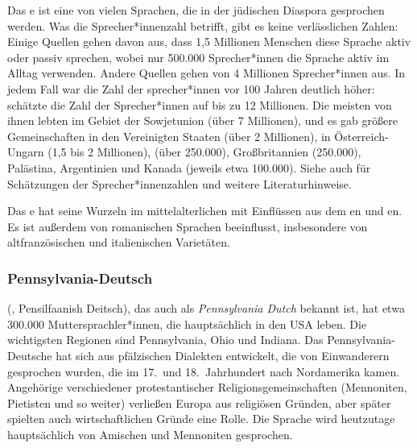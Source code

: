 Das e ist eine von vielen Sprachen, die in der jüdischen Diaspora gesprochen werden. Was die Sprecher*innenzahl betrifft,
gibt es keine verlässlichen Zahlen: Einige Quellen gehen davon aus, dass
1,5 Millionen Menschen diese Sprache aktiv oder passiv sprechen, wobei nur 500.000 Sprecher*innen die Sprache
aktiv im Alltag verwenden. Andere Quellen gehen von 4 Millionen
Sprecher*innen aus. In jedem Fall war die Zahl der sprecher*innen vor 100 Jahren deutlich
höher: \citet[]{Birnbaum1915a-u} schätzte die Zahl der Sprecher*innen auf bis zu 12 Millionen. Die meisten von
ihnen lebten im Gebiet der Sowjetunion (über 7 Millionen), und es gab größere Gemeinschaften in den Vereinigten Staaten (über 2 Millionen), in Österreich-Ungarn
(1,5 bis 2 Millionen),  (über 250.000), Großbritannien
(250.000), Palästina, Argentinien und Kanada (jeweils etwa 100.000). Siehe auch  für
Schätzungen der Sprecher*innenzahlen und weitere Literaturhinweise.

Das e hat seine Wurzeln
im mittelalterlichen  mit Einflüssen aus dem en und en. Es ist außerdem von
romanischen Sprachen beeinflusst, insbesondere von altfranzösischen und italienischen Varietäten.


\subsubsection{Pennsylvania-Deutsch}

 (, Pensilfaanish Deitsch), das auch als \emph{Pennsylvania Dutch} bekannt ist, hat etwa 300.000
Muttersprachler*innen, die hauptsächlich in den USA leben. Die wichtigsten Regionen sind Pennsylvania, Ohio und
Indiana. Das Pennsylvania-Deutsche hat sich aus pfälzischen Dialekten entwickelt, die von
Einwanderern gesprochen wurden, die im 17.\ und 18.\ Jahrhundert nach Nordamerika kamen.
Angehörige verschiedener protestantischer Religionsgemeinschaften (Mennoniten, Pietisten und so weiter) verließen Europa aus religiösen Gründen,
aber später spielten auch wirtschaftlichen Gründe eine Rolle. Die Sprache wird heutzutage hauptsächlich von Amischen und Mennoniten gesprochen. 




